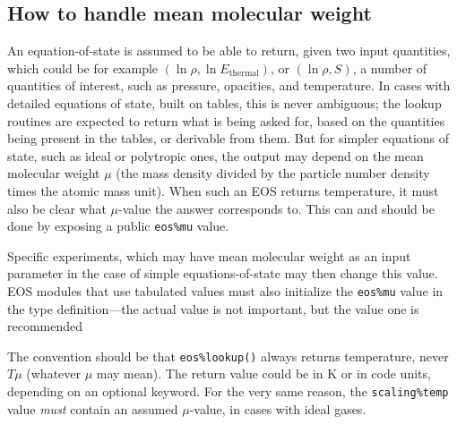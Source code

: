 \documentclass[paper=a4,fontsize=11pt]{scrartcl}
\numberwithin{equation}{section}		%
\numberwithin{figure}{section}			%
\numberwithin{table}{section}				%
\newcommand{\codecolor}{\color{Blue}}
\newcommand{\Code}[1]{{\codecolor\texttt{#1}}}
\begin{document}
\subsection{How to handle mean molecular weight}
\def\Eth{E_\mathrm{thermal}}
An equation-of-state is assumed to be able to return, given two input quantities, which could be for example $(\ln\rho,\ln\Eth)$, or $(\ln\rho,S)$, a number of quantities of interest, such as pressure, opacities, and temperature.  In cases with detailed equations of state, built on tables, this is never ambiguous; the lookup routines are expected to return what is being asked for, based on the quantities being present in the tables, or derivable from them.  But for simpler equations of state, such as ideal or polytropic ones, the output may depend on the mean molecular weight $\mu$ (the mass density divided by the particle number density times the atomic mass unit).  When such an EOS returns temperature, it must also be clear what $\mu$-value the answer corresponds to.  This can and should be done by exposing a public \Code{eos\%mu} value.

Specific experiments, which may have mean molecular weight as an input parameter in the case of simple equations-of-state may then change this value.  EOS modules that use tabulated values must also initialize the \Code{eos\%mu} value in the type definition---the actual value is not important, but the value one is recommended

The convention should be that \Code{eos\%lookup()} always returns temperature, never $T\mu$ (whatever $\mu$ may mean).  The return value could be in K or in code units, depending on an optional keyword.   For the very same reason, the \Code{scaling\%temp} value \textit{must} contain an assumed $\mu$-value, in cases with ideal gases.
\end{document}
